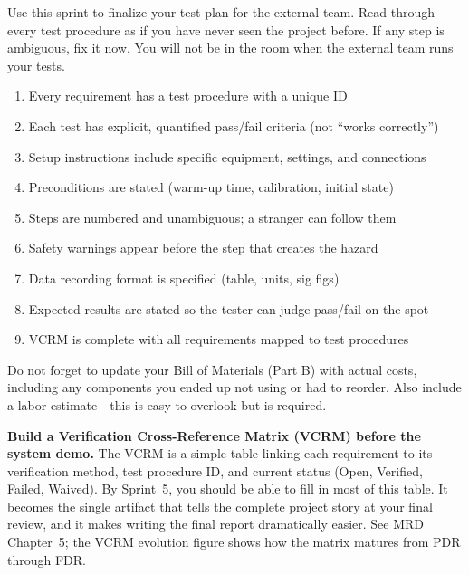 \documentclass[11pt,letterpaper]{article}
\begin{document}
\begin{tipbox}
Use this sprint to finalize your test plan for the external team. Read through every test procedure as if you have never seen the project before. If any step is ambiguous, fix it now. You will not be in the room when the external team runs your tests.
\end{tipbox}

\begin{checklistbox}
\begin{enumerate}[leftmargin=*, itemsep=1pt, topsep=0pt]
    \item Every requirement has a test procedure with a unique ID
    \item Each test has explicit, quantified pass/fail criteria (not ``works correctly'')
    \item Setup instructions include specific equipment, settings, and connections
    \item Preconditions are stated (warm-up time, calibration, initial state)
    \item Steps are numbered and unambiguous; a stranger can follow them
    \item Safety warnings appear before the step that creates the hazard
    \item Data recording format is specified (table, units, sig figs)
    \item Expected results are stated so the tester can judge pass/fail on the spot
    \item VCRM is complete with all requirements mapped to test procedures
\end{enumerate}
\end{checklistbox}

\begin{warnbox}
Do not forget to update your Bill of Materials (Part B) with actual costs, including any components you ended up not using or had to reorder. Also include a labor estimate---this is easy to overlook but is required.
\end{warnbox}

\begin{protip}
\textbf{Build a Verification Cross-Reference Matrix (VCRM) before the system demo.} The VCRM is a simple table linking each requirement to its verification method, test procedure ID, and current status (Open, Verified, Failed, Waived). By Sprint~5, you should be able to fill in most of this table. It becomes the single artifact that tells the complete project story at your final review, and it makes writing the final report dramatically easier. See MRD Chapter~5; the VCRM evolution figure shows how the matrix matures from PDR through FDR.
\end{protip}
\end{document}
